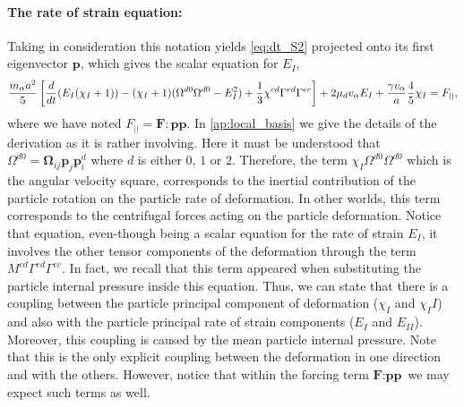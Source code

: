 \paragraph*{The rate of strain equation:}
Taking in consideration this notation yields \ref{eq:dt_S2} projected onto its first eigenvector $\textbf{p}$, which gives the scalar equation for $E_I$, 
\begin{align*}
    \frac{m_\alpha a^2}{5} \left[
        \frac{d}{dt} (E_I (\chi_I+1))
        - (\chi_I+1)( \Omega^{d0} \Omega^{d0}  - E_I^2) 
        + \frac{1}{3} \chi^{cd}
        \Gamma^{ed}\Gamma^{ec}
    \right]
    + 2 \mu_d v_\alpha E_I
    + \frac{\gamma v_\alpha }{a} 
    \frac{4  }{5} \chi_I
    = F_{||},
\end{align*} 
where we have noted $F_{||} = \textbf{F}: \textbf{pp}$.
In \ref{ap:local_basis} we  give the details of the derivation as it is rather involving. 
Here it must be understood that $\Omega^{d0}  = \bm\Omega_{ij} \textbf{p}_j \textbf{p}^{d}_i $ where $d$ is either $0$, $1$ or $2$. 
Therefore, the term $\chi_I \Omega^{d0} \Omega^{d0}$ which is the angular velocity square, corresponds to the inertial contribution of the particle rotation on the particle rate of deformation. 
In other worlds, this term corresponds to the centrifugal forces acting on the particle deformation. 
Notice that equation, even-though being a scalar equation for the rate of strain $E_I$, it involves the other tensor components of the deformation through the term $M^{cd}\Gamma^{ed}\Gamma^{ec}$. 
In fact, we recall that this term appeared when substituting the particle internal pressure inside this equation. 
Thus, we can state that there is a coupling between the particle principal component of deformation ($\chi_I$ and $\chi_II$) and also with the particle principal rate of strain components ($E_I$ and $E_{II}$). 
Moreover, this coupling is caused by the mean particle internal pressure. 
Note that this is the only explicit coupling  between the deformation in one direction and with the others.
However, notice that within the forcing term $\textbf{F}:\textbf{pp}$ we may expect such terms as well. 


